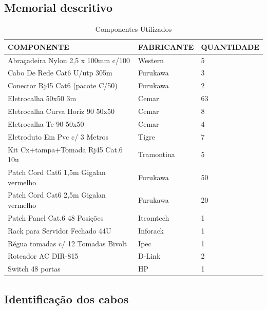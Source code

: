 \documentclass[	DIV=calc,%
paper=a4,%
fontsize=12pt,%
onecolumn]{scrartcl}	 					%
\begin{document}
	\clearpage
	\recalctypearea
	\subsection{Memorial descritivo}
	
\begin{table}[h!]
	\footnotesize
	\centering
	\caption{Componentes Utilizados}
	\label{tab2} %
	\begin{tabular}{lll}
		\toprule
		{\textbf{COMPONENTE}} & {\textbf{FABRICANTE}} & {\textbf{QUANTIDADE}} \\
		\midrule
		Abraçadeira Nylon 2,5 x 100mm c/100   & Western    & 5          \\
		Cabo De Rede Cat6 U/utp 305m          & Furukawa   & 3          \\
		Conector Rj45 Cat6 (pacote C/50)      & Furukawa   & 2         \\
		Eletrocalha 50x50 3m                  & Cemar      & 63         \\
		Eletrocalha Curva Horiz 90 50x50      & Cemar      & 8          \\
		Eletrocalha Te 90 50x50               & Cemar      & 4          \\
		Eletroduto Em Pvc c/ 3 Metros         & Tigre      & 7          \\
		Kit Cx+tampa+Tomada Rj45 Cat.6 10u    & Tramontina & 5          \\
		Patch Cord Cat6 1,5m Gigalan vermelho & Furukawa   & 50         \\
		Patch Cord Cat6 2,5m Gigalan vermelho & Furukawa   & 20         \\
		Patch Panel Cat.6 48 Posições         & Itcomtech  & 1          \\
		Rack para Servidor Fechado 44U        & Inforack   & 1          \\
		Régua tomadas c/ 12 Tomadas Bivolt    & Ipec       & 1          \\
		Roteador AC DIR-815                   & D-Link     & 2          \\
		Switch 48 portas                      & HP         & 1          \\
		\toprule
	\end{tabular}
\end{table}
	
	\subsection{Identificação dos cabos}
\end{document}
